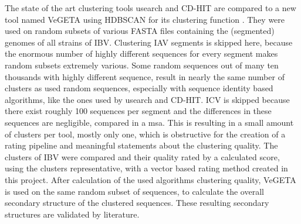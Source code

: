 The state of the art clustering tools usearch and CD-HIT are compared to a new tool named VeGETA using HDBSCAN for its clustering function \autocite{vegeta, Usearch, CD-HIT, hdbscan}. They were used on random subsets of various FASTA files containing the (segmented) genomes of all strains of \gls{IBV}. Clustering \gls{IAV} segments is skipped here, because the enormous number of highly different sequences for every segment makes random subsets extremely various. Some random sequences out of many ten thousands with highly different sequence, result in nearly the same number of clusters as used random sequences, especially with sequence identity based algorithms, like the ones used by usearch and CD-HIT. \gls{ICV} is skipped because there exist roughly 100 sequences per segment and the differences in these sequences are negligible, compared in a \gls{msa}. This is resulting in a small amount of clusters per tool, mostly only one, which is obstructive for the creation of a rating pipeline and meaningful statements about the clustering quality. The clusters of \gls{IBV} were compared and their quality rated by a calculated score, using the clusters representative, with a vector based rating method created in this project. After calculation of the used algorithms clustering quality, VeGETA is used on the same random subset of sequences, to calculate the overall secondary structure of the clustered sequences. These resulting secondary structures are validated by literature. 